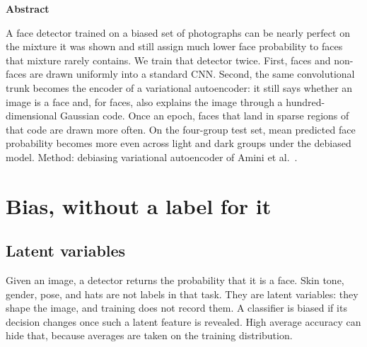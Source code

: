 \documentclass[14pt]{extarticle}
\begin{document}
\begin{titlepage}
\restoregeometry
\end{titlepage}

\clearpage
\thispagestyle{plain}
\noindent\begin{minipage}[c][\textheight][c]{\textwidth}
\centering
\begin{minipage}{0.78\textwidth}
\begin{center}
{\bfseries Abstract}
\end{center}
\vspace{0.2em}
A face detector trained on a biased set of photographs can be nearly perfect on the mixture it was shown and still assign much lower face probability to faces that mixture rarely contains. We train that detector twice. First, faces and non-faces are drawn uniformly into a standard CNN. Second, the same convolutional trunk becomes the encoder of a variational autoencoder: it still says whether an image is a face and, for faces, also explains the image through a hundred-dimensional Gaussian code. Once an epoch, faces that land in sparse regions of that code are drawn more often. On the four-group test set, mean predicted face probability becomes more even across light and dark groups under the debiased model. Method: debiasing variational autoencoder of Amini et al.~\cite{amini2019}.
\end{minipage}
\vspace*{2.4cm}
\end{minipage}
\clearpage

\tableofcontents
\clearpage

\section{Bias, without a label for it}
\subsection{Latent variables}
Given an image, a detector returns the probability that it is a face. Skin tone, gender, pose, and hats are not labels in that task. They are latent variables: they shape the image, and training does not record them. A classifier is biased if its decision changes once such a latent feature is revealed. High average accuracy can hide that, because averages are taken on the training distribution.
\end{document}
